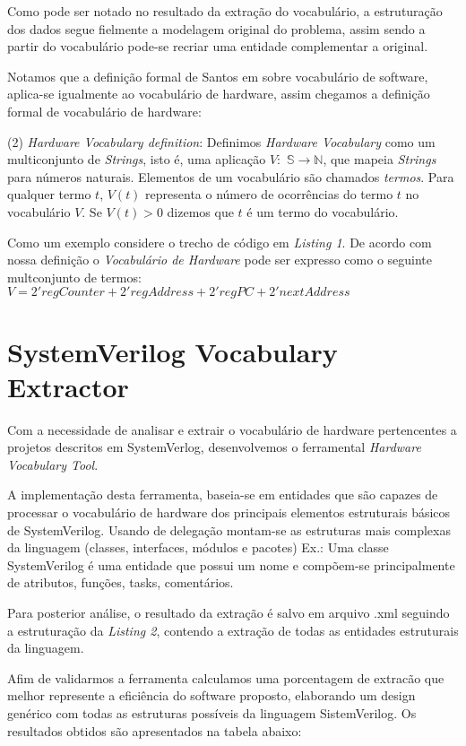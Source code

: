 \documentclass[12pt, twocolumn, a4paper]{article}
\begin{document}
Como pode ser notado no resultado da extração do vocabulário, a estruturação dos dados segue fielmente a modelagem original do problema, assim sendo a partir do vocabulário pode-se recriar uma entidade complementar a original.

Notamos que a definição formal de Santos em \cite{Santos2015} sobre vocabulário de software, aplica-se igualmente ao vocabulário de hardware, assim chegamos a definição formal de vocabulário de hardware:

(2) \textit{Hardware Vocabulary definition}: Definimos \textit{Hardware Vocabulary} como um multiconjunto de \textit{Strings}, isto é, uma aplicação $V:$ $\mathbb{S}\rightarrow\mathbb{N}$, que mapeia \textit{Strings} para números naturais. Elementos de um vocabulário são chamados \textit{termos}. Para qualquer termo $t$, $V(t)$ representa o número de ocorrências do termo $t$ no vocabulário $V$. Se $V(t)>0$ dizemos que $t$ é um termo do vocabulário.

Como um exemplo considere o trecho de código em \textit{Listing 1}. De acordo com nossa definição o \textit{Vocabulário de Hardware} pode ser expresso como o seguinte multconjunto de termos:\\

$V= 2'regCounter + 2'regAddress + 2'regPC + 2'nextAddress$


	\section{SystemVerilog Vocabulary Extractor}

\quad Com a necessidade de analisar e extrair o vocabulário de hardware pertencentes a projetos descritos em SystemVerlog, desenvolvemos o ferramental \textit{Hardware Vocabulary Tool}.

A implementação desta ferramenta, baseia-se em entidades que são capazes de processar o vocabulário de hardware dos principais elementos estruturais básicos de SystemVerilog. Usando de delegação montam-se as estruturas mais complexas da linguagem (classes, interfaces, módulos e pacotes) Ex.: Uma classe SystemVerilog é uma entidade que possui um nome e compõem-se principalmente de atributos, funções, tasks, comentários.

Para posterior análise, o resultado da extração é salvo em arquivo .xml seguindo a estruturação da \textit{Listing 2}, contendo a extração de todas as entidades estruturais da linguagem.
	
Afim de validarmos a ferramenta calculamos uma porcentagem de extracão que melhor represente a eficiência do software proposto, elaborando um design genérico com todas as estruturas possíveis da linguagem SistemVerilog. Os resultados obtidos são apresentados na tabela abaixo:
\end{document}
